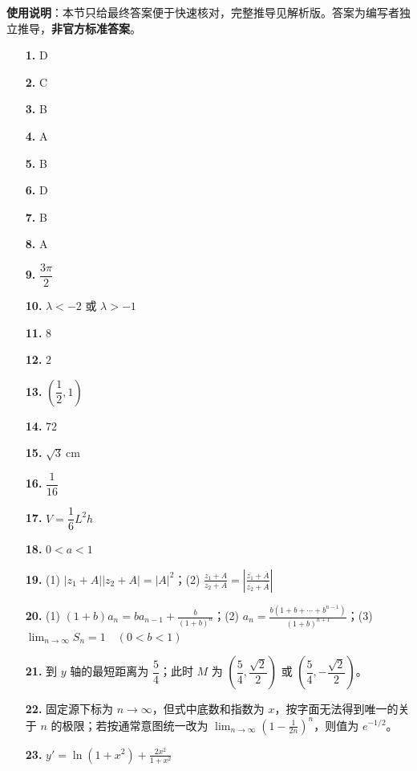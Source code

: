 
\begin{gknotice}
\textbf{使用说明}：本节只给最终答案便于快速核对，完整推导见解析版。答案为编写者独立推导，\textbf{非官方标准答案}。
\end{gknotice}

\begin{itemize}[leftmargin=2.6em]
  \item[\textbf{1.}] D
  \item[\textbf{2.}] C
  \item[\textbf{3.}] B
  \item[\textbf{4.}] A
  \item[\textbf{5.}] B
  \item[\textbf{6.}] D
  \item[\textbf{7.}] B
  \item[\textbf{8.}] A
  \item[\textbf{9.}] $\dfrac{3\pi}{2}$
  \item[\textbf{10.}] $\lambda<-2$ 或 $\lambda>-1$
  \item[\textbf{11.}] $8$
  \item[\textbf{12.}] $2$
  \item[\textbf{13.}] $\left(\dfrac12,1\right)$
  \item[\textbf{14.}] $72$
  \item[\textbf{15.}] $\sqrt3\ \mathrm{cm}$
  \item[\textbf{16.}] $\dfrac1{16}$
  \item[\textbf{17.}] $V=\dfrac16L^2h$
  \item[\textbf{18.}] $0<a<1$
  \item[\textbf{19.}] (1) $|z_1+A||z_2+A|=|A|^2$；(2) $\displaystyle\frac{z_1+A}{z_2+A}=\left|\frac{\overline{z_1}+\overline A}{\overline{z_2}+\overline A}\right|$
  \item[\textbf{20.}] (1) $\displaystyle (1+b)a_n=ba_{n-1}+\frac{b}{(1+b)^n}$；(2) $\displaystyle a_n=\frac{b(1+b+\cdots+b^{n-1})}{(1+b)^{n+1}}$；(3) $\displaystyle\lim_{n\to\infty}S_n=1\quad(0<b<1)$
  \item[\textbf{21.}] 到 $y$ 轴的最短距离为 $\dfrac54$；此时 $M$ 为 $\left(\dfrac54,\dfrac{\sqrt2}{2}\right)$ 或 $\left(\dfrac54,-\dfrac{\sqrt2}{2}\right)$。
  \item[\textbf{22.}] 固定源下标为 $n\to\infty$，但式中底数和指数为 $x$，按字面无法得到唯一的关于 $n$ 的极限；若按通常意图统一改为 $\displaystyle\lim_{n\to\infty}\left(1-\frac1{2n}\right)^n$，则值为 $e^{-1/2}$。
  \item[\textbf{23.}] $\displaystyle y'=\ln(1+x^2)+\frac{2x^2}{1+x^2}$
\end{itemize}
